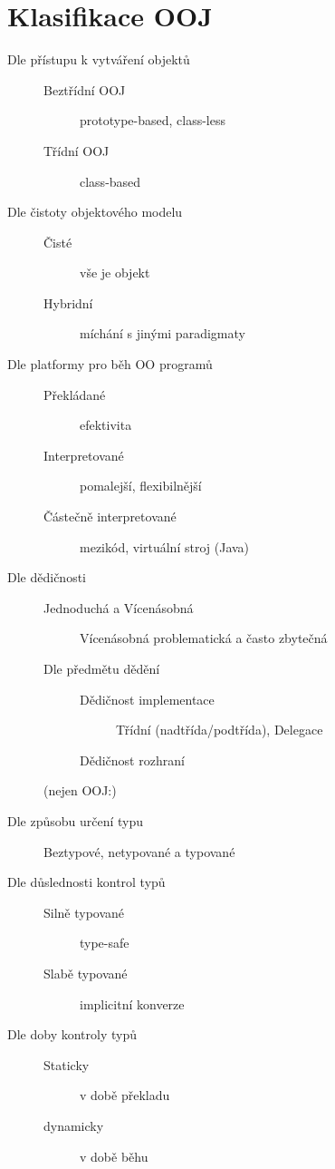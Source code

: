 \documentclass[a4paper, 11pt]{report}
\begin{document}
\section{Klasifikace OOJ}
\begin{description}
	\item[Dle přístupu k vytváření objektů] \hfill
	\begin{description}
		\item[Beztřídní OOJ] prototype-based, class-less
		\item[Třídní OOJ] class-based
	\end{description}
	\item[Dle čistoty objektového modelu] \hfill
	\begin{description}
		\item[Čisté] vše je objekt
		\item[Hybridní] míchání s jinými paradigmaty
	\end{description}
	\item[Dle platformy pro běh OO programů] \hfill
	\begin{description}
		\item[Překládané] efektivita
		\item[Interpretované] pomalejší, flexibilnější
		\item[Částečně interpretované] mezikód, virtuální stroj (Java)
	\end{description}
	\item[Dle dědičnosti] \hfill
	\begin{description}
		\item[Jednoduchá a Vícenásobná] Vícenásobná problematická a často zbytečná
		\item[Dle předmětu dědění] \hfill
		\begin{description}
			\item[Dědičnost implementace] Třídní (nadtřída/podtřída), Delegace
			\item[Dědičnost rozhraní]
		\end{description}
	\end{description}
	(nejen OOJ:)
	\item[Dle způsobu určení typu] Beztypové, netypované a typované
	\item[Dle důslednosti kontrol typů] \hfill
	\begin{description}
		\item[Silně typované] type-safe
		\item[Slabě typované] implicitní konverze
	\end{description}
	\item[Dle doby kontroly typů] \hfill
	\begin{description}
		\item[Staticky] v době překladu
		\item[dynamicky] v době běhu
	\end{description}
	
	
\end{description}
\end{document}
